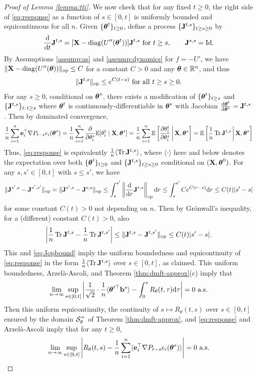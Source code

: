 \begin{proof}[Proof of Lemma \ref{lemma:tti}]
We now check that for any fixed $t \geq 0$, the right side of
\eqref{eq:response} as a function
of $s \in [0,t]$ is uniformly bounded and equicontinuous
for all $n$. Given $\{\boldsymbol{\theta}^t\}_{t \geq 0}$,
define a process $\{\mathbf{J}^{t,s}\}_{t \geq s \geq 0}$ by
\[\frac{\mathrm{d}}{\mathrm{d} t}\mathbf{J}^{t,s}=[\mathbf{X}-\operatorname{diag}(U''(\boldsymbol{\theta}^t))]\mathbf{J}^{t,s} \text{ for } t \geq
s, \qquad \mathbf{J}^{s,s}=\mathrm{Id}.\]
By Assumptions \ref{assump:as} and \ref{assump:dynamics} for $f=-U'$,
we have $\|\mathbf{X}-\operatorname{diag}(U''(\boldsymbol{\theta}))\|_{\mathrm{op}} \leq C$ for a constant $C>0$ and any
$\boldsymbol{\theta} \in \mathbb{R}^n$, and thus
\begin{equation}\label{eq:Jopbound}
\|\mathbf{J}^{t,s}\|_{\mathrm{op}} \leq e^{C(t-s)} \text{ for all } t \geq s \geq 0.
\end{equation}
For any $s \geq 0$, conditional on $\boldsymbol{\theta}^s$, there
exists a modification of $\{\boldsymbol{\theta}^t\}_{t \geq s}$ 
and $\{\mathbf{J}^{t,s}\}_{t:\,t \geq s}$ where $\boldsymbol{\theta}^t$ is
continuously-differentiable in $\boldsymbol{\theta}^s$ 
with Jacobian $\frac{\mathrm{d} \boldsymbol{\theta}^t}{\mathrm{d} \boldsymbol{\theta}^s}=\mathbf{J}^{t,s}$
\cite[Theorem II.3.1]{kunita2006stochastic}.
Then by dominated convergence,
\[\frac{1}{n}\sum_{i=1}^n \mathbf{e}_i^\top \nabla P_{t-s} e_i(\boldsymbol{\theta}^s)
=\frac{1}{n}\sum_{i=1}^n \frac{\partial}{\partial \theta_i^s}
\mathbb{E}[\theta_i^t \mid \mathbf{X},\boldsymbol{\theta}^s]
=\frac{1}{n}\sum_{i=1}^n 
\mathbb{E}\left[\frac{\partial \theta_i^t}{\partial \theta_i^s}\,\bigg|\,
\mathbf{X},\boldsymbol{\theta}^s\right]
=\mathbb{E}\left[\frac{1}{n}\operatorname{Tr} \mathbf{J}^{t,s}\,\bigg|\,\mathbf{X},\boldsymbol{\theta}^s\right]\]
Thus, \eqref{eq:response} is equivalently 
$\frac{1}{n} \langle \operatorname{Tr} \mathbf{J}^{t,s} \rangle$, where $\langle \cdot \rangle$
here and below denotes the expectation over both
$\{\boldsymbol{\theta}^t\}_{t \geq 0}$ and $\{\mathbf{J}^{t,s}\}_{t \geq s \geq 0}$
conditional on $(\mathbf{X},\boldsymbol{\theta}^0)$. For any $s,s' \in [0,t]$ with
$s \leq s'$, we have
\[\|\mathbf{J}^{s',s}-\mathbf{J}^{s',s'}\|_{\mathrm{op}}
=\|\mathbf{J}^{s',s}-\mathbf{J}^{s,s}\|_{\mathrm{op}}
\leq \int_s^{s'}
\left\|\frac{\mathrm{d}}{\mathrm{d} r}\mathbf{J}^{r,s}\right\|_{\mathrm{op}} \mathrm{d} r
\leq \int_s^{s'} Ce^{C(r-s)}\mathrm{d} r \leq C(t)|s'-s|\]
for some constant $C(t)>0$ not depending on $n$. Then by Gr\"onwall's
inequality, for a (different) constant $C(t)>0$, also
\[\left|\frac{1}{n}\operatorname{Tr} \mathbf{J}^{t,s}-\frac{1}{n}\operatorname{Tr} \mathbf{J}^{t,s'}\right|
\leq \|\mathbf{J}^{t,s}-\mathbf{J}^{t,s'}\|_{\mathrm{op}} \leq C(t)|s'-s|.\]
This and \eqref{eq:Jopbound} imply
the uniform boundedness and equicontinuity of \eqref{eq:response} in the form
$\frac{1}{n} \langle \operatorname{Tr} \mathbf{J}^{t,s} \rangle$ over
$s \in [0,t]$, as claimed. This uniform boundedness, Arzel\`a-Ascoli, and
Theorem \ref{thm:dmft-approx}(c) imply that
\[\lim_{n \to \infty}
\sup_{s \in [0,t]}
\left|\frac{1}{\sqrt{2}} \cdot \frac{1}{n}\langle \boldsymbol{\theta}^{t\top}\mathbf{b}^s \rangle
-\int_0^s R_\theta(t,\tau)\mathrm{d} \tau\right|=0 \text{ a.s.}\]
Then this uniform equicontinuity, the
continuity of $s \mapsto R_\theta(t,s)$ over $s \in [0,t]$ ensured by the domain $\mathcal{S}_\theta^+$ of
Theorem \ref{thm:dmft-approx}, and
\eqref{eq:response} and Arzel\`a-Ascoli imply that for any $t \geq 0$,
\begin{equation}\label{eq:Rthetarepr}
\lim_{n \to \infty} \sup_{s \in [0,t]}
\left|R_\theta(t,s)-\frac{1}{n}\sum_{i=1}^n \langle \mathbf{e}_i^\top \nabla
P_{t-s}e_i(\boldsymbol{\theta}^s) \rangle\right|=0 \text{ a.s.}
\end{equation}


\end{proof}
